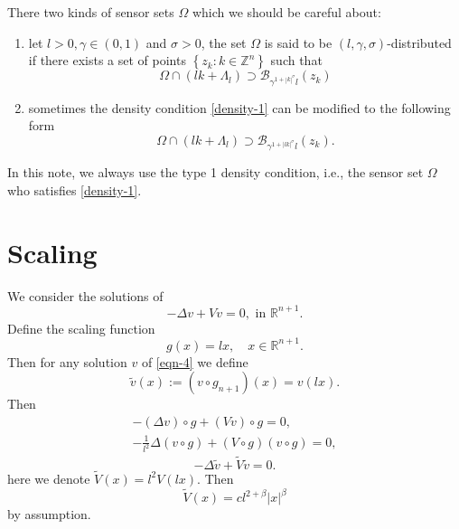 \documentclass[12pt]{amsart}
\newcommand\R{\ensuremath{\mathbb{R}}}
\newcommand\Z{\ensuremath{\mathbb{Z}}}
\theoremstyle{definition}
\begin{document}
There two kinds of sensor sets $\Omega$ which we should be careful about:
\begin{enumerate}
	\item let $l>0,\gamma \in (0,1)$ and  $\sigma >0$, the set $\Omega$ is said to be $(l,\gamma,\sigma )$-distributed if there exists a set of points $\left\{z_k: k\in \Z^{n}\right\} $ such that
		\begin{equation}\label{density-1}
			\Omega \cap (lk+\Lambda_l) \supset \mathcal{B}_{\gamma^{1+|k|^{\sigma }}l}(z _k)\tag{Type 1}
		\end{equation}
	\item sometimes the density condition \eqref{density-1} can be modified to the following form
		\begin{equation}
			\Omega \cap (lk+\Lambda_l) \supset \mathcal{B}_{\gamma^{1+|lk|^{\sigma }}l}(z_k).\label{density-2}\tag{Type 2}
		\end{equation} 
\end{enumerate}

In this note, we always use the type 1 density condition, i.e., the sensor set $\Omega$ who satisfies \eqref{density-1}. 


\section{Scaling}


We consider the solutions of
\begin{equation}
	-\Delta v+V v=0, \text{ in }\R^{n+1}.\label{eqn-4}
\end{equation}
Define the scaling function 
\[
       g(x)=lx, \quad x \in \R^{n+1}.
\] 
Then for any solution $v$ of \eqref{eqn-4} we define 
\begin{equation}
\widetilde{v}(x):=(v\circ g_{n+1})(x)=v(lx).
\end{equation}
Then
\begin{gather*}
	-\left( \Delta v \right) \circ g + \left( Vv \right) \circ g =0,\\
	-\frac{1}{l^2} \Delta \left( v\circ g \right) +\left( V\circ g \right) \left( v\circ g \right) =0,
\end{gather*}
\begin{equation}
	-\Delta \widetilde{v}+\widetilde{V}\widetilde{v}=0.\label{eqn-5}
\end{equation}
here we denote $\widetilde{V}(x)= l^2 V(lx)$. Then
\begin{equation}
	\widetilde{V}(x)= cl^{2+\beta }|x|^{\beta }
\end{equation}
by assumption.
\end{document}
